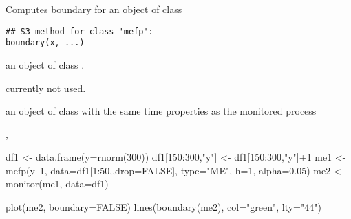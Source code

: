 \begin{Description}\relax
Computes boundary for an object of class \end{Description}
\begin{Usage}
\begin{verbatim}
## S3 method for class 'mefp':
boundary(x, ...)\end{verbatim}
\end{Usage}
\begin{Arguments}
\begin{ldescription}
\item[\code{x}] an object of class .
\item[\code{...}] currently not used.
\end{ldescription}
\end{Arguments}
\begin{Value}
an object of class  with the same time properties as
the monitored process\end{Value}
\begin{SeeAlso}\relax
{}, \end{SeeAlso}
\begin{Examples}
\begin{ExampleCode}
df1 <- data.frame(y=rnorm(300))
df1[150:300,"y"] <- df1[150:300,"y"]+1
me1 <- mefp(y~1, data=df1[1:50,,drop=FALSE], type="ME", h=1,
              alpha=0.05)
me2 <- monitor(me1, data=df1)

plot(me2, boundary=FALSE)
lines(boundary(me2), col="green", lty="44")
\end{ExampleCode}
\end{Examples}

